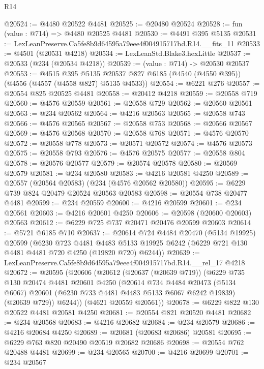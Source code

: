 \begin{lexlean}{R14}
\begin{coremodule}
@20524 := @4480 @20522 @4481
@20525 := @20480 @20524
@20528 := fun (value : @714) => @4480 @20525 @4481
@20530 := @4491 @395 @5135
@20531 := LexLeanPreserve.Ca5fe8b9d64595a79eee4f004915717bd.R14.__fits_11
@20533 := @4501 (@20531 @4218)
@20534 := LexLeanStd.Blake3.hexLittle
@20537 := @20533 (@234 (@20534 @4218))
@20539 := (value : @714) -> @20530 @20537
@20553 := @4515
    @395
    @5135
    @20537
    @827
    @6185
    (@4540 (@4550 @395))
    (@4556 (@4557 (@4558 @827) @5135 @4533))
@20554 := @6221 @276
@20557 := @20554 @825 @20525 @4481
@20558 := @20412 @4218
@20559 := @20558 @719
@20560 := @4576 @20559
@20561 := @20558 @729
@20562 := @20560 @20561
@20563 := @234 @20562
@20564 := @4216 @20563
@20565 := @20558 @743
@20566 := @4576 @20565
@20567 := @20558 @753
@20568 := @20566 @20567
@20569 := @4576 @20568
@20570 := @20558 @768
@20571 := @4576 @20570
@20572 := @20558 @778
@20573 := @20571 @20572
@20574 := @4576 @20573
@20575 := @20558 @793
@20576 := @4576 @20575
@20577 := @20558 @804
@20578 := @20576 @20577
@20579 := @20574 @20578
@20580 := @20569 @20579
@20581 := @234 @20580
@20583 := @4216 @20581 @4250
@20589 := @20557 (@20564 @20583) (@234 (@4576 @20562 @20580))
@20595 := @6229 @739 @824 @20479 @20524 @20563 @20583
@20598 := @20554 @738 @20477 @4481
@20599 := @234 @20559
@20600 := @4216 @20599
@20601 := @234 @20561
@20603 := @4216 @20601 @4250
@20606 := @20598 (@20600 @20603) @20563
@20612 := @6229 @725 @737 @20471 @20476 @20599 @20603
@20614 := @5721 @6185 @710
@20637 := @20614
    @724
    @4484
    @20470
    (@5134 @19925)
    @20599
    (@6230
      @723
      @4481
      @4483
      @5133
      @19925
      @6242
      (@6229 @721 @130 @4481 @4481 @720 @4250 (@19820 @720) @6244))
@20639 := LexLeanPreserve.Ca5fe8b9d64595a79eee4f004915717bd.R14.__rel_17 @4218
@20672 := @20595
    (@20606
      (@20612
        (@20637 (@20639 @719))
        (@6229
          @735
          @130
          @20474
          @4481
          @20601
          @4250
          (@20614
            @734
            @4484
            @20473
            (@5134 @6067)
            @20601
            (@6230 @733 @4481 @4483 @5133 @6067 @6242 @19839)
            (@20639 @729))
          @6244))
      (@4621 @20559 @20561))
@20678 := @6229 @822 @130 @20522 @4481 @20581 @4250
@20681 := @20554 @821 @20520 @4481
@20682 := @234 @20568
@20683 := @4216 @20682
@20684 := @234 @20579
@20686 := @4216 @20684 @4250
@20689 := @20681 (@20683 @20686) @20581
@20695 := @6229 @763 @820 @20490 @20519 @20682 @20686
@20698 := @20554 @762 @20488 @4481
@20699 := @234 @20565
@20700 := @4216 @20699
@20701 := @234 @20567

\end{coremodule}
\end{lexlean}
